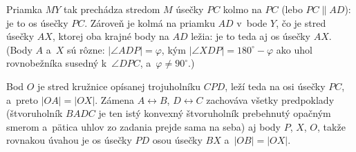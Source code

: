 {    Priamka $MY$ tak prechádza stredom $M$ úsečky $PC$ kolmo na $PC$ (lebo $PC \parallel AD$): je to os úsečky $PC$. Zároveň je kolmá na priamku $AD$ v~bode $Y$, čo je stred úsečky $AX$, ktorej oba krajné body na $AD$ ležia: je to teda aj os úsečky $AX$. (Body $A$ a~$X$ sú rôzne: $|\angle ADP| = \varphi$, kým $|\angle XDP| = 180^\circ - \varphi$ ako uhol rovnobežníka susedný k~$\angle DPC$, a~$\varphi \neq 90^\circ$.)

    Bod $O$ je stred kružnice opísanej trojuholníku $CPD$, leží teda na osi úsečky $PC$, a~preto $|OA| = |OX|$. Zámena $A \leftrightarrow B$, $D \leftrightarrow C$ zachováva všetky predpoklady (štvoruholník $BADC$ je ten istý konvexný štvoruholník prebehnutý opačným smerom a~pätica uhlov zo zadania prejde sama na seba) aj body $P$, $X$, $O$, takže rovnakou úvahou je os úsečky $PD$ osou úsečky $BX$ a~$|OB| = |OX|$.
}

